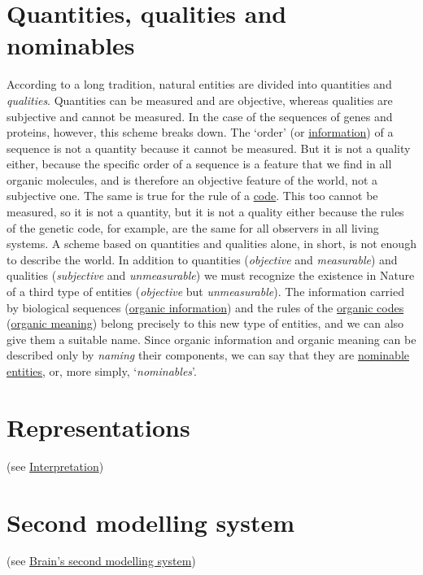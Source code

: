 \documentclass[12pt]{article}
\begin{document}
\section{Quantities, qualities and nominables}
According to a long tradition, natural entities are divided into \hypertarget{physical_quantities}{quantities} and \textit{qualities}. Quantities can be measured and are objective, whereas qualities are subjective and cannot be measured. In the case of the sequences of genes and proteins, however, this scheme breaks down. The `order' (or \hyperlink{organic_information}{information}) of a sequence is not a quantity because it cannot be measured. But it is not a quality either, because the specific order of a sequence is a feature that we find in all organic molecules, and is therefore an objective feature of the world, not a subjective one. The same is true for the rule of a \hyperlink{code}{code}. This too cannot be measured, so it is not a quantity, but it is not a quality either because the rules of the genetic code, for example, are the same for all observers in all living systems. A scheme based on quantities and qualities alone, in short, is not enough to describe the world. In addition to quantities (\textit{objective} and \textit{measurable}) and qualities (\textit{subjective} and \textit{unmeasurable}) we must recognize the existence in Nature of a third type of entities (\textit{objective} but \textit{unmeasurable}). The information carried by biological sequences (\hyperlink{organic_information}{organic information}) and the rules of the \hyperlink{organic_codes}{organic codes} (\hyperlink{organic_meaning}{organic meaning}) belong precisely to this new type of entities, and we can also give them a suitable name. Since organic information and organic meaning can be described only by \textit{naming} their components, we can say that they are \hyperlink{nominable_entities}{nominable entities}, or, more simply, `\textit{nominables}'.


\hypertarget{representations}{}
\section{Representations} (see \hyperlink{interpretation}{Interpretation})


\hypertarget{second_modelling_system}{}
\section{Second modelling system} (see \hyperlink{brains_second_modelling_system}{Brain's second modelling system})
\end{document}
